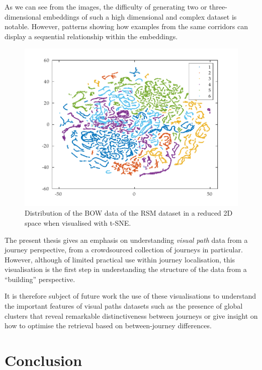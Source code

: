 As we can see from the images, the difficulty of generating two or three-dimensional embeddings of such a high dimensional and complex dataset is notable. However, patterns showing how examples from the same corridors can display a sequential relationship within the embeddings.


\begin{figure}
\centering
\includegraphics[width=\textwidth]{gfx/Chapter04/tsne_dsift_2d.pdf}
\caption{Distribution of the BOW data of the RSM dataset in a reduced 2D space when visualised with t-SNE.}
\label{fig:tsne2d}
\end{figure}

The present thesis gives an emphasis on understanding \textit{visual path} data from a journey perspective, from a crowdsourced collection of journeys in particular. However, although of limited practical use within journey localisation, this visualisation is the first step in understanding the structure of the data from a ``building'' perspective.

It is therefore subject of future work the use of these visualisations to understand the important features of visual paths datasets such as the presence of global clusters that reveal remarkable distinctiveness between journeys or give insight on how to optimise the retrieval based on between-journey differences.

\section{Conclusion}


